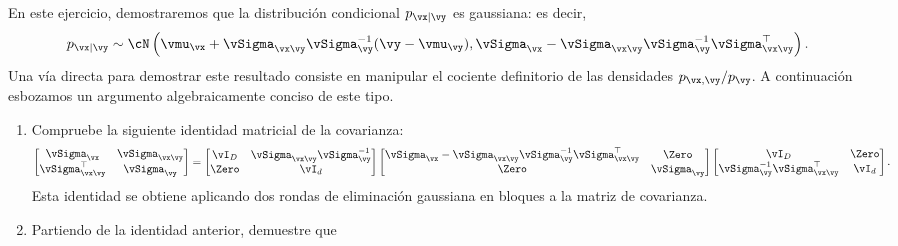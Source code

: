 \documentclass[../../book-main.tex]{subfiles}
\begin{document}
\begin{exercise}
    En este ejercicio, demostraremos que la distribución condicional
    $p_{\vx \mid
    \vy}$ es gaussiana: es decir,
    \begin{equation}\label{eq:gaussian-conditional-eqn}
        p_{\vx \mid \vy} \sim \cN\left(
            \vmu_{\vx} + \vSigma_{\vx\vy} \vSigma_{\vy}^{-1} (\vy
            - \vmu_{\vy}),
            \vSigma_{\vx} - \vSigma_{\vx\vy} \vSigma_{\vy}^{-1}
            \vSigma_{\vx\vy}^{\top}
        \right).
    \end{equation}
    Una vía directa para demostrar este resultado consiste en manipular el cociente definitorio de
    las densidades $p_{\vx, \vy} / p_{\vy}$. A continuación esbozamos un argumento algebraicamente conciso
    de este tipo.

    \begin{enumerate}
        \item Compruebe la siguiente identidad matricial de la covarianza:
            \begin{equation}\label{eq:gaussian-conditional-covariance-block}
                \begin{bmatrix}
                    \vSigma_{\vx} & \vSigma_{\vx\vy} \\
                    \vSigma_{\vx\vy}^\top & \vSigma_{\vy}
                \end{bmatrix}
                =
                \begin{bmatrix}
                    \vI_D & \vSigma_{\vx\vy}\vSigma_{\vy}^{-1} \\
                    \Zero & \vI_d
                \end{bmatrix}
                \begin{bmatrix}
                    \vSigma_{\vx} - \vSigma_{\vx\vy} \vSigma_{\vy}^{-1}
                    \vSigma_{\vx\vy}^{\top} & \Zero \\
                    \Zero & \vSigma_{\vy}
                \end{bmatrix}
                \begin{bmatrix}
                    \vI_D & \Zero\\
                    \vSigma_{\vy}^{-1}\vSigma_{\vx\vy}^\top & \vI_d
                \end{bmatrix}.
            \end{equation}
            Esta identidad se obtiene aplicando dos rondas de
            eliminación gaussiana
            en bloques a la matriz de covarianza.
        \item Partiendo de la identidad anterior, demuestre que

\end{enumerate}
\end{exercise}
\end{document}

